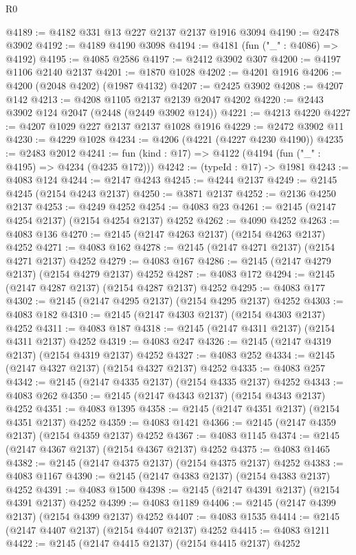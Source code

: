 \begin{lexlean}{R0}
\begin{coremodule}
@4189 := @4182 @331 @13 @227 @2137 @2137 @1916 @3094
@4190 := @2478 @3902
@4192 := @4189 @4190 @3098
@4194 := @4181 (fun ("_" : @4086) => @4192)
@4195 := @4085 @2586
@4197 := @2412 @3902 @307
@4200 := @4197 @1106 @2140 @2137
@4201 := @1870 @1028
@4202 := @4201 @1916
@4206 := @4200 (@2048 @4202) (@1987 @4132)
@4207 := @2425 @3902
@4208 := @4207 @142
@4213 := @4208 @1105 @2137 @2139 @2047 @4202
@4220 := @2443 @3902 @124 @2047 (@2448 (@2449 @3902 @124))
@4221 := @4213 @4220
@4227 := @4207 @1029 @227 @2137 @2137 @1028 @1916
@4229 := @2472 @3902 @11
@4230 := @4229 @1028
@4234 := @4206 (@4221 (@4227 @4230 @4190))
@4235 := @2483 @2012
@4241 := fun (kind : @17) => @4122 (@4194 (fun ("_" : @4195) => @4234 (@4235 @172)))
@4242 := (typeId : @17) -> @1981
@4243 := @4083 @124
@4244 := @2147 @4243
@4245 := @4244 @2137
@4249 := @2145 @4245 (@2154 @4243 @2137)
@4250 := @3871 @2137
@4252 := @2136 @4250 @2137
@4253 := @4249 @4252
@4254 := @4083 @23
@4261 := @2145 (@2147 @4254 @2137) (@2154 @4254 @2137) @4252
@4262 := @4090 @4252
@4263 := @4083 @136
@4270 := @2145 (@2147 @4263 @2137) (@2154 @4263 @2137) @4252
@4271 := @4083 @162
@4278 := @2145 (@2147 @4271 @2137) (@2154 @4271 @2137) @4252
@4279 := @4083 @167
@4286 := @2145 (@2147 @4279 @2137) (@2154 @4279 @2137) @4252
@4287 := @4083 @172
@4294 := @2145 (@2147 @4287 @2137) (@2154 @4287 @2137) @4252
@4295 := @4083 @177
@4302 := @2145 (@2147 @4295 @2137) (@2154 @4295 @2137) @4252
@4303 := @4083 @182
@4310 := @2145 (@2147 @4303 @2137) (@2154 @4303 @2137) @4252
@4311 := @4083 @187
@4318 := @2145 (@2147 @4311 @2137) (@2154 @4311 @2137) @4252
@4319 := @4083 @247
@4326 := @2145 (@2147 @4319 @2137) (@2154 @4319 @2137) @4252
@4327 := @4083 @252
@4334 := @2145 (@2147 @4327 @2137) (@2154 @4327 @2137) @4252
@4335 := @4083 @257
@4342 := @2145 (@2147 @4335 @2137) (@2154 @4335 @2137) @4252
@4343 := @4083 @262
@4350 := @2145 (@2147 @4343 @2137) (@2154 @4343 @2137) @4252
@4351 := @4083 @1395
@4358 := @2145 (@2147 @4351 @2137) (@2154 @4351 @2137) @4252
@4359 := @4083 @1421
@4366 := @2145 (@2147 @4359 @2137) (@2154 @4359 @2137) @4252
@4367 := @4083 @1145
@4374 := @2145 (@2147 @4367 @2137) (@2154 @4367 @2137) @4252
@4375 := @4083 @1465
@4382 := @2145 (@2147 @4375 @2137) (@2154 @4375 @2137) @4252
@4383 := @4083 @1167
@4390 := @2145 (@2147 @4383 @2137) (@2154 @4383 @2137) @4252
@4391 := @4083 @1500
@4398 := @2145 (@2147 @4391 @2137) (@2154 @4391 @2137) @4252
@4399 := @4083 @1189
@4406 := @2145 (@2147 @4399 @2137) (@2154 @4399 @2137) @4252
@4407 := @4083 @1535
@4414 := @2145 (@2147 @4407 @2137) (@2154 @4407 @2137) @4252
@4415 := @4083 @1211
@4422 := @2145 (@2147 @4415 @2137) (@2154 @4415 @2137) @4252

\end{coremodule}
\end{lexlean}
